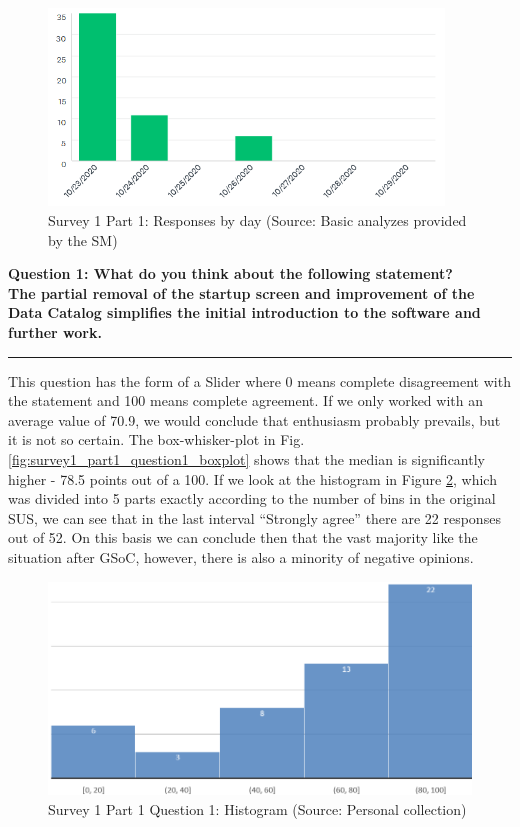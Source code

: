 \documentclass[a4paper,10pt,twoside]{article}
\begin{document}
\begin{figure}[hbt!] 
\begin{center}
\includegraphics[width=10.5cm]{../surveys/analyzed_data/survey1_part1_insight2.png} 
\caption[Survey 1 Part 1: Responses by day]{Survey 1 Part 1: Responses by day (Source: Basic analyzes provided by the SM)}
\label{fig:survey1_part1_insight2}
\end{center}
\end{figure}

\newpage
\noindent \textbf{Question 1: What do you think about the following statement? \\
The partial removal of the startup screen and improvement of the Data Catalog simplifies the initial introduction to the software and further work.}
\par\noindent\rule{\textwidth}{0.4pt}
\noindent This question has the form of a Slider where 0 means complete disagreement with the statement and 100 means complete agreement. If we only worked with an average value of 70.9, we would conclude that enthusiasm probably prevails, but it is not so certain. The box-whisker-plot in Fig. \ref{fig:survey1_part1_question1_boxplot} shows that the median is significantly higher - 78.5 points out of a 100. If we look at the histogram in Figure \ref{fig:survey1_part1_question1_histogram}, which was divided into 5 parts exactly according to the number of bins in the original SUS, we can see that in the last interval ``Strongly agree'' there are 22 responses out of 52. On this basis we can conclude then that the vast majority like the situation after GSoC, however, there is also a minority of negative opinions.

\begin{figure}[hbt!] 
\begin{center}
\includegraphics[width=12cm]{../surveys/analyzed_data/survey1_part1_question1_excel_histogram.png} 
\caption[Survey 1 Part 1 Question 1: Histogram]{Survey 1 Part 1 Question 1: Histogram (Source: Personal collection)}
\label{fig:survey1_part1_question1_histogram}
\end{center}
\end{figure}
\end{document}
